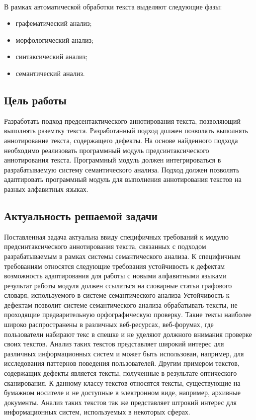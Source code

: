 \paragraph{}
В рамках автоматической обработки текста выделяют следующие фазы:
\begin{itemize}
\item
графематический анализ;
\item
морфологический анализ;
\item
синтаксический анализ;
\item
семантический анализ.
\end{itemize}


\subsection{Цель работы}
Разработать подход предсентактического аннотирования текста, позволяющий выполнять раземтку текста. Разработанный подход должен позволять выполнять аннотирование текста, содержащего дефекты. На основе найденного подхода необходимо реализовать программный модуль предсинтаксического аннотирования текста. Программный модуль должен интегрироваться в разрабатываемую систему семантического анализа. Подход должен позволять адаптировать программный модуль для выполнения аннотирования текстов на разных алфавитных языках.

\subsection{Актуальность решаемой задачи}
Поставленная задача актуальна ввиду специфичных требований к модулю предсинтаксического аннотирования текста, связанных с подходом разрабатываемым в рамках системы семантического анализа. 
К специфичным требованиям относятся следующие требования
устойчивость к дефектам 
возможность адаптирования для работы с новыми алфавитными языками
результат работы модуля должен ссылаться на словарные статьи графового словаря, используемого в системе семантического анализа
Устойчивость к дефектам позволит системе семантического анализа обрабатывать тексты, не проходящие предварительную орфографическую проверку. Такие текты наиболее широко распространены в различных веб-ресурсах, веб-форумах, где пользователи набирают текс в спешке и не уделяют должного внимания проверке своих текстов. Анализ таких текстов представляет широкий интерес для различных информационных систем и может быть использован, например,  для исследования паттернов поведения пользователей. Другим примером текстов, содержащих дефекты является тексты, полученные в результате оптического сканирования. К данному классу текстов относятся тексты, существующие на бумажном носителе и не доступные в электронном виде, например, архивные документы. Анализ таких текстов так же представляет штрокий интерес для информационных систем, используемых в некоторых сферах.